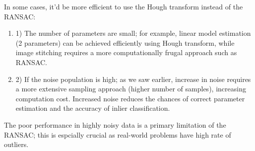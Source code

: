 \documentclass{article}
\begin{document}
In some cases, it'd be more efficient to use the Hough transform instead of the RANSAC:
\begin{enumerate}
  \item 1) The number of parameters are small; for example, linear model estimation (2 parameters) can be achieved efficiently using Hough transform, while image stitching requires a more computationally frugal approach such as RANSAC.
  \item 2) If the noise population is high; as we saw earlier, increase in noise requires a more extensive sampling approach (higher number of samples), increasing computation cost. Increased noise reduces the chances of correct parameter estimation and the accuracy of inlier classification.
\end{enumerate}

The poor performance in highly noisy data is a primary limitation of the RANSAC; this is espcially crucial as real-world problems have high rate of outliers.

\small


\end{document}
